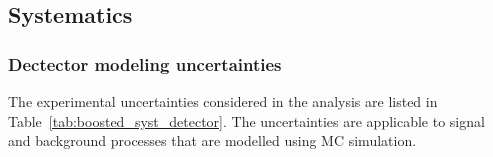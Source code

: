 \newpage
  
\subsection{Systematics}
\subsubsection{Dectector modeling uncertainties}
\label{sec:boosted_syst_detector}
 
The experimental uncertainties considered in the analysis are listed in Table~\ref{tab:boosted_syst_detector}.
The uncertainties are applicable to signal and background processes that are modelled using MC simulation.
 
\begin{table}
\resizebox{\textwidth}{!}
{
\begin{tabular}{l|l}
 

\end{tabular}}
\end{table}
